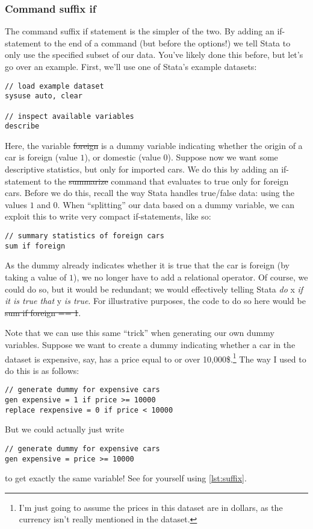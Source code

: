 \subsubsection{Command suffix if}
The command suffix if statement is the simpler of the two.
By adding an if-statement to the end of a command (but before the options!) we tell Stata to only use the specified subset of our data.
You've likely done this before,
but let's go over an example.
First, we'll use one of Stata's example datasets:
\begin{verbatim}
// load example dataset
sysuse auto, clear

// inspect available variables
describe
\end{verbatim}

Here, the variable \st{foreign} is a dummy variable indicating whether the origin of a car is foreign (value $1$), or domestic (value $0$).
Suppose now we want some descriptive statistics,
but only for imported cars.
We do this by adding an if-statement to the \st{summarize} command that evaluates to true only for foreign cars.
Before we do this,
recall the way Stata handles true/false data:
using the values $1$ and $0$.
When ``splitting'' our data based on a dummy variable,
we can exploit this to write very compact if-statements,
like so:
\begin{verbatim}
// summary statistics of foreign cars
sum if foreign
\end{verbatim}
As the dummy already indicates whether it is true that the car is foreign (by taking a value of $1$),
we no longer have to add a relational operator.
Of course, we could do so, but it would be redundant;
we would effectively telling Stata \emph{do }x \emph{if it is true that }y \emph{is true}.
For illustrative purposes,
the code to do so here would be \st{sum if foreign == 1}.

Note that we can use this same ``trick'' when generating our own dummy variables.
Suppose we want to create a dummy indicating whether a car in the dataset is expensive,
say, has a price equal to or over 10,000\$.\footnote{%
I'm just going to assume the prices in this dataset are in dollars,
as the currency isn't really mentioned in the dataset.}
The way I used to do this is as follows:
\begin{verbatim}
// generate dummy for expensive cars
gen expensive = 1 if price >= 10000
replace rexpensive = 0 if price < 10000
\end{verbatim}
But we could actually just write
\begin{verbatim}
// generate dummy for expensive cars
gen expensive = price >= 10000
\end{verbatim}
to get exactly the same variable!
See for yourself using \cref{lst:suffix}.

